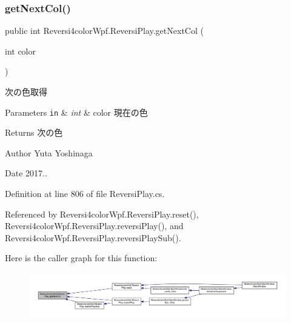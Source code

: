 \subsubsection{\texorpdfstring{get\+Next\+Col()}{getNextCol()}}
{\footnotesize\ttfamily public int Reversi4color\+Wpf.\+Reversi\+Play.\+get\+Next\+Col (\begin{DoxyParamCaption}\item[{int}]{color }\end{DoxyParamCaption})}



次の色取得 


\begin{DoxyParams}[1]{Parameters}
\mbox{\tt in}  & {\em int} & color 現在の色 \\
\hline
\end{DoxyParams}
\begin{DoxyReturn}{Returns}
次の色 
\end{DoxyReturn}
\begin{DoxyAuthor}{Author}
Yuta Yoshinaga 
\end{DoxyAuthor}
\begin{DoxyDate}{Date}
2017.. 
\end{DoxyDate}


Definition at line 806 of file Reversi\+Play.\+cs.



Referenced by Reversi4color\+Wpf.\+Reversi\+Play.\+reset(), Reversi4color\+Wpf.\+Reversi\+Play.\+reversi\+Play(), and Reversi4color\+Wpf.\+Reversi\+Play.\+reversi\+Play\+Sub().

Here is the caller graph for this function\+:
\nopagebreak
\begin{figure}[H]
\begin{center}
\leavevmode
\includegraphics[width=350pt]{class_reversi4color_wpf_1_1_reversi_play_a5ad5b6251ce357ddfe1540c5559b9371_icgraph}
\end{center}
\end{figure}
\mbox{\label{class_reversi4color_wpf_1_1_reversi_play_a37fb774e5829a4dd99d9af0ca020f912}} 

